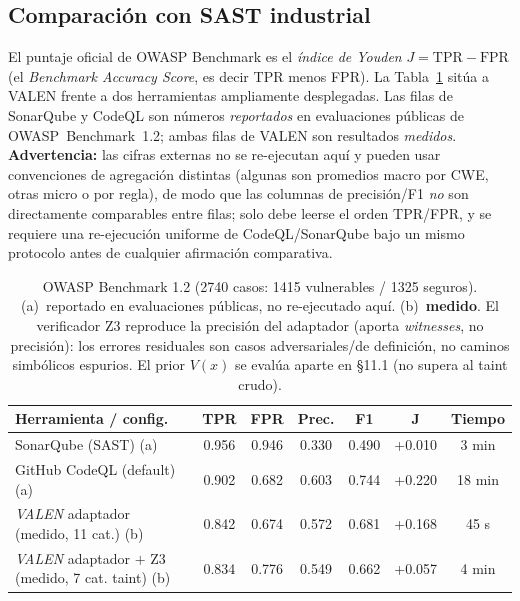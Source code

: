 \documentclass[11pt]{article}
\begin{document}
\subsection{Comparación con SAST industrial}
El puntaje oficial de OWASP Benchmark es el \emph{índice de Youden}
$J = \text{TPR} - \text{FPR}$ (el \emph{Benchmark Accuracy Score}, es decir TPR
menos FPR). La
Tabla~\ref{tab:cmp-es} sitúa a VALEN frente a dos herramientas ampliamente
desplegadas. Las filas de SonarQube y CodeQL son números \emph{reportados} en
evaluaciones públicas de OWASP~Benchmark~1.2; ambas filas de VALEN son
resultados \emph{medidos}. \textbf{Advertencia:} las cifras externas no se
re-ejecutan aquí y pueden usar convenciones de agregación distintas (algunas son
promedios macro por CWE, otras micro o por regla), de modo que las columnas de
precisión/F1 \emph{no} son directamente comparables entre filas; solo debe leerse
el orden TPR/FPR, y se requiere una re-ejecución uniforme de CodeQL/SonarQube bajo
un mismo protocolo antes de cualquier afirmación comparativa.

\begin{table}[h]
\centering
\small
\setlength{\tabcolsep}{4pt}
\begin{tabular}{lcccccc}
\toprule
\textbf{Herramienta / config.} & \textbf{TPR} & \textbf{FPR} & \textbf{Prec.} & \textbf{F1} & \textbf{J} & \textbf{Tiempo} \\
\midrule
SonarQube (SAST) (a) & 0.956 & 0.946 & 0.330 & 0.490 & +0.010 & 3 min \\
GitHub CodeQL (default) (a) & 0.902 & 0.682 & 0.603 & 0.744 & +0.220 & 18 min \\
\emph{VALEN} adaptador (medido, 11 cat.) (b) & 0.842 & 0.674 & 0.572 & 0.681 & +0.168 & 45 s \\
\emph{VALEN} adaptador $+$ Z3 (medido, 7 cat. taint) (b) & 0.834 & 0.776 & 0.549 & 0.662 & +0.057 & 4 min \\
\bottomrule
\end{tabular}
\caption{OWASP Benchmark 1.2 (2740 casos: 1415 vulnerables / 1325 seguros).
(a)~reportado en evaluaciones públicas, no re-ejecutado aquí. (b)~\textbf{medido}.
El verificador Z3 reproduce la precisión del adaptador (aporta \emph{witnesses},
no precisión): los errores residuales son casos adversariales/de definición, no
caminos simbólicos espurios. El prior $V(x)$ se evalúa aparte en \S11.1 (no
supera al taint crudo).}
\label{tab:cmp-es}
\end{table}
\end{document}
